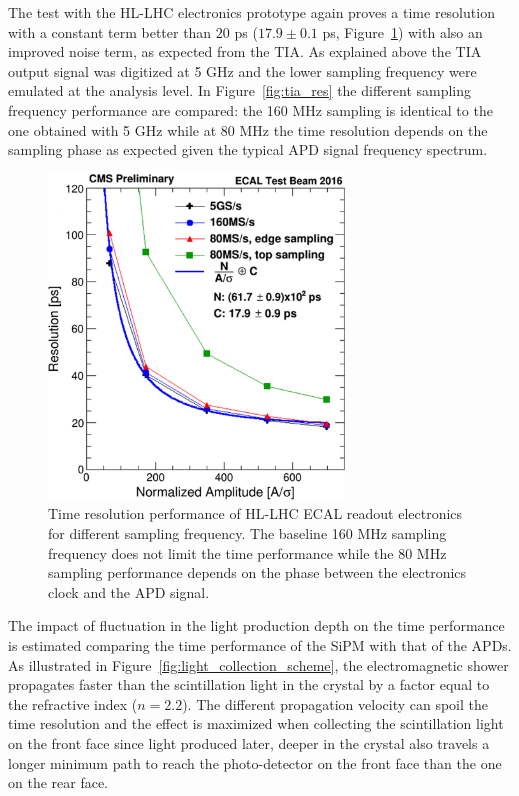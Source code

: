 The test with the HL-LHC electronics prototype again proves a time resolution with a constant term
better than $20$ ps ($17.9\pm 0.1$ ps, Figure~\ref{fig:tia_tres}) with also an improved noise term, as expected
from the TIA.
As explained above the TIA output signal was digitized at 5 GHz and the lower sampling frequency were emulated at the
analysis level. In Figure~\ref{fig:tia_res} the different sampling frequency performance are compared:
the 160 MHz sampling is identical to the one obtained with 5 GHz while at 80 MHz the time resolution
depends on the sampling phase as expected given the typical APD signal frequency spectrum. 

\begin{figure}[h!]
  \centering
  \includegraphics[width = 0.7\textwidth]{figures/upgrade/sampling_freq_res_comp.png}
  \caption{Time resolution performance of HL-LHC ECAL readout electronics for different sampling frequency.
    The baseline 160 MHz sampling frequency does not limit the time performance while the 80 MHz sampling
    performance depends on the phase between the electronics clock and the APD signal.}
  \label{fig:tia_tres}
\end{figure}

The impact of fluctuation in the light production depth on the time performance is estimated comparing the
time performance of the SiPM with that of the APDs. As illustrated in Figure~\ref{fig:light_collection_scheme}, 
the electromagnetic shower propagates faster than the scintillation light in the crystal by a factor equal
to the \PbWO refractive index ($n=2.2$). The different propagation velocity can spoil the time resolution and the
effect is maximized when collecting the scintillation light on the front face since light produced later, deeper in
the crystal also travels a longer minimum path to reach the photo-detector on the front face than the one on the rear face.

